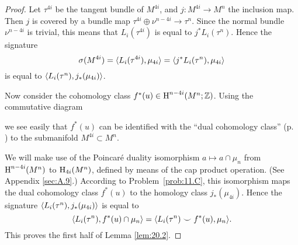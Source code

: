 \documentclass[../main]{subfiles}
\begin{document}
\begin{proof}
Let $\tau^{4i}$ be the tangent bundle of $M^{4i}$, and $j : M^{4i} \longrightarrow M^n$ the inclusion map. Then $j$ is covered by a bundle map $\tau^{4i} \oplus \nu^{n - 4i} \longrightarrow \tau^n$. Since the normal bundle $\nu^{n - 4i}$ is trivial, this means that $L_i(\tau^{4i})$ is equal to $j^\ast L_i(\tau^n)$. Hence the signature \[\sigma(M^{4i}) = \langle L_i(\tau^{4i}),\mu_{4i}\rangle = \langle j^\ast L_i(\tau^n),\mu_{4i}\rangle\] is equal to $\langle L_i(\tau^n),j_\ast(\mu_{4i})\rangle$. 

Now consider the cohomology class $f^\ast(u) \in \operatorname{H}^{n - 4i}(M^n; \mathbb Z)$. Using the commutative diagram 
\begin{center}
\end{center}
we see easily that $f^\ast(u)$ can be identified with the ``dual cohomology class'' (p. \pageref{cor:11.04}) to the submanifold $M^{4i} \subset M^n$. 

We will make use of the Poincar\'e duality isomorphism $a \mapsto a \cap \mu_n$ from $\operatorname{H}^{n - 4i}(M^n)$ to $\operatorname{H}_{4i}(M^n)$, defined by means of the cap product operation. (See Appendix \ref{sec:A.9}.) According to Problem~\ref{prob:11.C}, this isomorphism maps the dual cohomology class $f^\ast(u)$ to the homology class $j_\ast(\mu_{4i})$. Hence the signature $\langle L_i(\tau^n),j_\ast(\mu_{4i})\rangle$ is equal to \[\langle L_i(\tau^n),f^\ast(u) \cap \mu_n\rangle = \langle L_i(\tau^n) \smile f^\ast(u),\mu_n\rangle.\] This proves the first half of Lemma \ref{lem:20.2}.


\end{proof}
\end{document}
